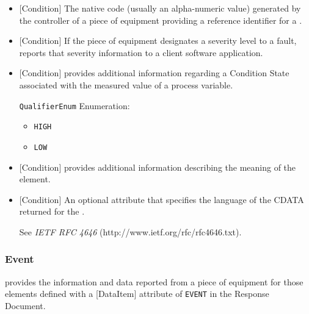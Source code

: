 \begin{itemize}

\item {}[Condition] \newline The native code (usually an alpha-numeric value) generated by the controller of a piece of equipment providing a reference identifier for a .

\item {}[Condition] \newline If the piece of equipment designates a severity level to a fault,  reports that severity information to a client software application.

\item {}[Condition] \newline {} provides additional information regarding a \gls{Condition State} associated with the measured value of a process variable.

\texttt{QualifierEnum} Enumeration:

\begin{itemize}
\item \texttt{HIGH} \newline  
\item \texttt{LOW} \newline  
\end{itemize}


\item {}[Condition] \newline {} provides additional information describing the meaning of the  element.

\item {}[Condition] \newline An optional attribute that specifies the language of the CDATA returned for the . 

See \textit{IETF RFC 4646} (http://www.ietf.org/rfc/rfc4646.txt).
\end{itemize}

\subsubsection{Event}




 provides the information and data reported from a piece of equipment for those  elements defined with a [DataItem] attribute of \texttt{EVENT} in the  \gls{Response Document}.


